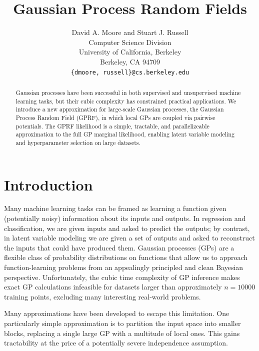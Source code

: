 \documentclass{article}
\begin{document}
\title{Gaussian Process Random Fields}

\author{
David A. Moore and Stuart J. Russell\\
Computer Science Division\\
University of California, Berkeley\\
Berkeley, CA 94709\\
\texttt{\{dmoore, russell\}@cs.berkeley.edu} 
}

\maketitle


\begin{abstract}
Gaussian processes have been successful in both supervised and
unsupervised machine learning tasks, but their cubic complexity has
constrained practical applications. We introduce a new approximation
for large-scale Gaussian processes, the Gaussian Process Random Field (GPRF),
in which local GPs are coupled via pairwise potentials. The GPRF
likelihood is a simple, tractable, and parallelizeable approximation to the full GP marginal
likelihood, enabling latent variable modeling and hyperparameter
selection on large datasets.
\end{abstract}

\section{Introduction}

Many machine learning tasks can be framed as learning a function given
(potentially noisy) information about its inputs and outputs. In
regression and classification, we are given inputs and asked to
predict the outputs; by contrast, in latent variable modeling we are
given a set of outputs and asked to reconstruct the inputs that could
have produced them. Gaussian processes (GPs) are a flexible class of
probability distributions on functions that allow us to approach
function-learning problems from an appealingly principled and clean
Bayesian perspective. Unfortunately, the cubic time complexity of GP
inference makes exact GP calculations infeasible for
datasets larger than approximately $n=10000$ training points,
excluding many interesting real-world problems.

Many approximations have been
developed to escape this limitation. One particularly simple approximation is to partition the
input space into smaller blocks, replacing a single large GP with a
multitude of local ones. This gains tractability at the
price of a potentially severe independence assumption. 
\end{document}
